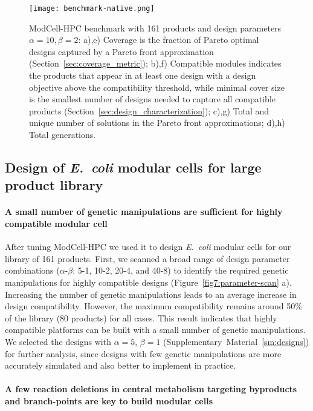 {\begin{figure}[hp]
    \centering
    \texttt{[image: benchmark-native.png]}
    \caption[ModCell-HPC benchmark with 161 products]{ModCell-HPC benchmark with 161 products and design parameters $\alpha=10, \beta=2$: a),e) Coverage is the fraction of Pareto optimal designs captured by a Pareto front approximation (Section~\ref{sec:coverage_metric});
    b),f) Compatible modules indicates the products that appear in at least one design with a design objective above the compatibility threshold, while minimal cover size is the smallest number of designs needed to capture all compatible products (Section~\ref{sec:design_characterization});
    c),g) Total and unique number of solutions in the Pareto front approximations;
    d),h) Total generations.}
    \label{fig7:benchmark-161prod}
\end{figure}

\subsection{Design of \textit{E.~coli} modular cells for large product library}

\paragraph{A small number of genetic manipulations are sufficient for highly compatible modular cell}
After tuning ModCell-HPC we used it to design \textit{E.~coli} modular cells for our library of 161 products.
First, we scanned a broad range of design parameter combinations ($\alpha$-$\beta$: 5-1, 10-2, 20-4, and 40-8) to identify the required genetic manipulations for highly compatible designs (Figure~\ref{fig7:parameter-scan} a).
Increasing the number of genetic manipulations leads to an average increase in design compatibility.
However, the maximum compatibility remains around 50\% of the library (80 products) for all cases.
This result indicates that highly compatible platforms can be built with a small number of genetic manipulations.
We selected the designs with $\alpha=5$, $\beta=1$ (Supplementary~Material~\ref{sm:designs}) for further analysis, since designs with few genetic manipulations are more accurately simulated and also better to implement in practice.

\paragraph{A few reaction deletions in central metabolism targeting byproducts and branch-points are key to build modular cells}

}
